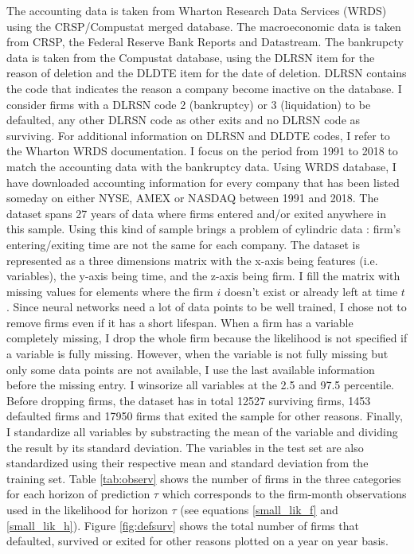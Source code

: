 The accounting data is taken from Wharton Research Data Services (WRDS) using the CRSP/Compustat merged database. The macroeconomic data is taken from CRSP, the Federal Reserve Bank Reports and Datastream. The bankrupcty data is taken from the Compustat database, using the DLRSN item for the reason of deletion and the DLDTE item for the date of deletion. DLRSN contains the code that indicates the reason a company become inactive on the database. I consider firms with a DLRSN code 2 (bankruptcy) or 3 (liquidation) to be defaulted, any other DLRSN code as other exits and no DLRSN code as surviving. For additional information on DLRSN and DLDTE codes, I refer to the Wharton WRDS documentation. I focus on the period from 1991 to 2018 to match the accounting data with the bankruptcy data. Using WRDS database, I have downloaded accounting information for every company that has been listed someday on either NYSE, AMEX or NASDAQ between 1991 and 2018. The dataset spans 27 years of data where firms entered and/or exited anywhere in this sample. Using this kind of sample brings a problem of cylindric data : firm's entering/exiting time are not the same for each company. The dataset is represented as a three dimensions matrix with the x-axis being features (i.e. variables), the y-axis being time, and the z-axis being firm. I fill the matrix with missing values for elements where the firm $i$ doesn't exist or already left at time $t$. 
Since neural networks need a lot of data points to be well trained, I chose not to remove firms even if it has a short lifespan. When a firm has a variable completely missing, I drop the whole firm because the likelihood is not specified if a variable is fully missing. However, when the variable is not fully missing but only some data points are not available, I use the last available information before the missing entry. I winsorize all variables at the 2.5 and 97.5 percentile. Before dropping firms, the dataset has in total 12527 surviving firms, 1453 defaulted firms and 17950 firms that exited the sample for other reasons. Finally, I standardize all variables by substracting the mean of the variable and dividing the result by its standard deviation. The variables in the test set are also standardized using their respective mean and standard deviation from the training set. Table \ref{tab:observ} shows the number of firms in the three categories for each horizon of prediction $\tau$ which corresponds to the firm-month observations used in the likelihood for horizon $\tau$ (see equations \ref{small_lik_f} and \ref{small_lik_h}). Figure \ref{fig:defsurv} shows the total number of firms that defaulted, survived or exited for other reasons plotted on a year on year basis.

